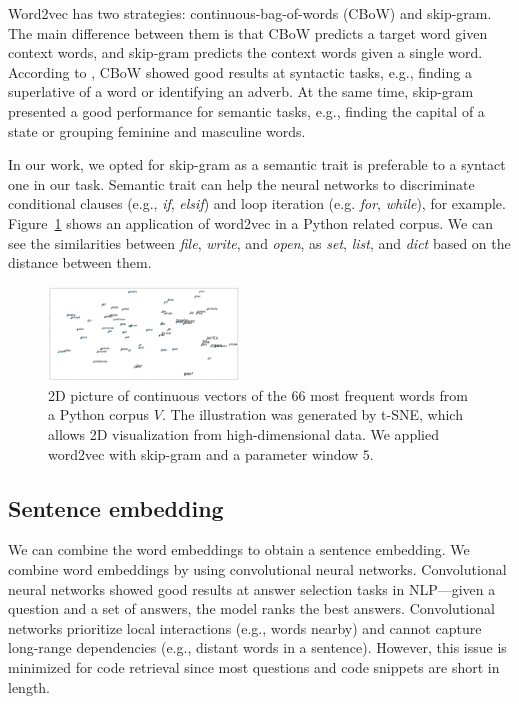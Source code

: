 \documentclass[sigconf]{acmart}
\begin{document}
Word2vec has two strategies: continuous-bag-of-words (CBoW) and skip-gram. The main difference between them is that CBoW predicts a target word given context words, and skip-gram predicts the context words given a single word. According to \citet{mikolov2013distributed}, CBoW showed good results at syntactic tasks, e.g., finding a superlative of a word or identifying an adverb. At the same time, skip-gram presented a good performance for semantic tasks, e.g., finding the capital of a state or grouping feminine and masculine words. 

In our work, we opted for skip-gram as a semantic trait is preferable to a syntact one in our task. Semantic trait can help the neural networks to discriminate conditional clauses (e.g., \emph{if}, \emph{elsif}) and loop iteration (e.g. \emph{for}, \emph{while}), for example. Figure~\ref{fig:tsne-code-snippet-python} shows an application of word2vec in a Python related corpus. We can see the similarities between \emph{file}, \emph{write}, and \emph{open}, as \emph{set}, \emph{list}, and \emph{dict} based on the distance between them.

\begin{figure}[H]
\includegraphics[width=0.45\textwidth]{figuras/code_tsne.png}
\caption{2D picture of continuous vectors of the 66 most frequent words from a Python corpus $V$. The illustration was generated by t-SNE, which allows 2D visualization from high-dimensional data. We applied word2vec with skip-gram and a parameter window $5$.}

\label{fig:tsne-code-snippet-python}
\end{figure}

\subsection{Sentence embedding}

We can combine the word embeddings to obtain a sentence embedding. We combine word embeddings by using convolutional neural networks. Convolutional neural networks showed good results at answer selection tasks in NLP---given a question and a set of answers, the model ranks the best answers. Convolutional networks prioritize local interactions (e.g., words nearby) and cannot capture long-range dependencies (e.g., distant words in a sentence). However, this issue is minimized for code retrieval since most questions and code snippets are short in length.
\end{document}
